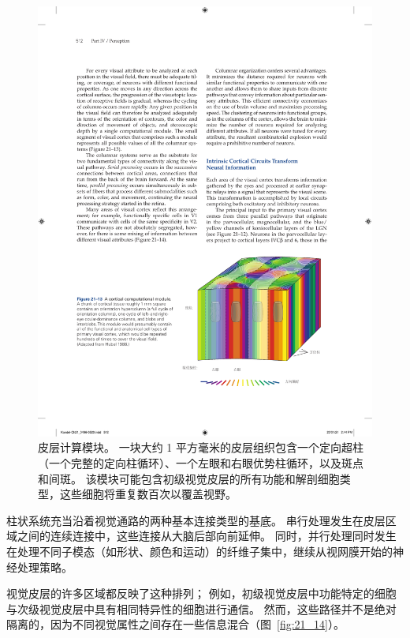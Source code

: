 \begin{figure}[htbp]
	\centering
	\includegraphics[width=0.75\linewidth]{chap21/fig_21_13}
	\caption{皮层计算模块。 
		一块大约 1 平方毫米的皮层组织包含一个定向超柱（一个完整的定向柱循环）、一个左眼和右眼优势柱循环，以及斑点和间斑。
		该模块可能包含初级视觉皮层的所有功能和解剖细胞类型，这些细胞将重复数百次以覆盖视野\cite{hubel1995eye}。}
	\label{fig:21_13}
\end{figure}


柱状系统充当沿着视觉通路的两种基本连接类型的基底。
串行处理发生在皮层区域之间的连续连接中，这些连接从大脑后部向前延伸。
同时，并行处理同时发生在处理不同子模态（如形状、颜色和运动）的纤维子集中，继续从视网膜开始的神经处理策略。


视觉皮层的许多区域都反映了这种排列；
例如，初级视觉皮层中功能特定的细胞与次级视觉皮层中具有相同特异性的细胞进行通信。
然而，这些路径并不是绝对隔离的，因为不同视觉属性之间存在一些信息混合（图~\ref{fig:21_14}）。


